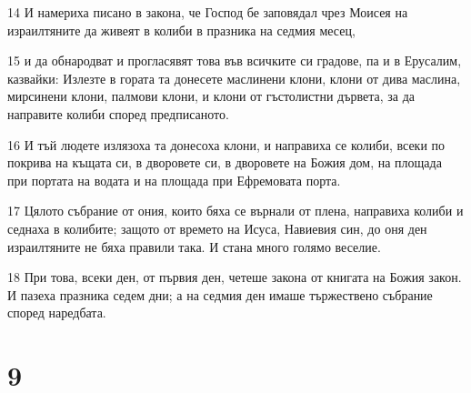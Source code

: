 \par 14 И намериха писано в закона, че Господ бе заповядал чрез Моисея на израилтяните да живеят в колиби в празника на седмия месец,
\par 15 и да обнародват и прогласявят това във всичките си градове, па и в Ерусалим, казвайки: Излезте в гората та донесете маслинени клони, клони от дива маслина, мирсинени клони, палмови клони, и клони от гъстолистни дървета, за да направите колиби според предписаното.
\par 16 И тъй людете излязоха та донесоха клони, и направиха се колиби, всеки по покрива на къщата си, в дворовете си, в дворовете на Божия дом, на площада при портата на водата и на площада при Ефремовата порта.
\par 17 Цялото събрание от ония, които бяха се върнали от плена, направиха колиби и седнаха в колибите; защото от времето на Исуса, Навиевия син, до оня ден израилтяните не бяха правили така. И стана много голямо веселие.
\par 18 При това, всеки ден, от първия ден, четеше закона от книгата на Божия закон. И пазеха празника седем дни; а на седмия ден имаше тържествено събрание според наредбата.

\chapter{9}

